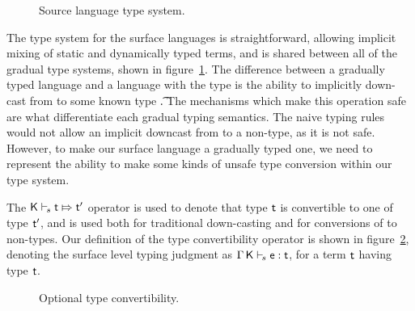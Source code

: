 \documentclass[a4paper,USenglish]{tex/lipics-v2016}
\begin{document}
\begin{figure}[!h]
\begin{mathpar}
          \end{mathpar}
  
  \vspace{2mm}
  
  \hrulefill
  \caption{Source language type system.}\label{fig:slts}
\end{figure}

The type system for the surface languages is straightforward, allowing
implicit mixing of static and dynamically typed terms, and is shared between
all of the gradual type systems, shown in figure~\ref{fig:slts}.  The
difference between a gradually typed language and a language with the \any
type is the ability to implicitly down-cast from \any to some known type
\t. The mechanisms which make this operation safe are what differentiate
each gradual typing semantics.  The naive typing rules would not allow an
implicit downcast from \any to a non-\any type, as it is not safe. However,
to make our surface language a gradually typed one, we need to represent the
ability to make some kinds of unsafe type conversion within our type system.

The $\ConvertE\K{s}{\t}{\tp}$ operator is used to denote that type $\t$ is
convertible to one of type $\tp$, and is used both for traditional
down-casting and for conversions of \any to non-\any types. Our definition
of the type convertibility operator is shown in figure~\ref{fig:tyconvert},
denoting the surface level typing judgment as $\EnvTypeS\Env\K\e\t$, for a
term $\t$ having type $\t$.

\begin{figure}[!h]
  \hrulefill  \small  \vspace{-3mm}
  
  \begin{mathpar}
    
    
  \end{mathpar}
  \vspace{-8mm}
  
  \hrulefill
  \caption{Optional type convertibility.}\label{fig:tyconvert}
\end{figure}
\end{document}
